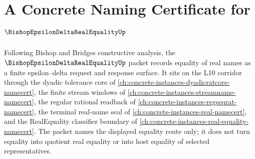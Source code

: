 \chapter{A Concrete Naming Certificate for $\BishopEpsilonDeltaRealEqualityUp$}
\label{ch:concrete-instances-bishop-epsilon-delta-real-equality-namecert}

Following Bishop and Bridges constructive analysis, the $\BishopEpsilonDeltaRealEqualityUp$ packet records equality of real names as a finite epsilon--delta request and response surface. It sits on the L10 corridor through the dyadic tolerance core of \autoref{ch:concrete-instances-dyadicratcore-namecert}, the finite stream windows of \autoref{ch:concrete-instances-streamname-namecert}, the regular rational readback of \autoref{ch:concrete-instances-regseqrat-namecert}, the terminal real-name seal of \autoref{ch:concrete-instances-real-namecert}, and the RealEquality classifier boundary of \autoref{ch:concrete-instances-real-equality-namecert}. The packet names the displayed equality route only; it does not turn equality into quotient real equality or into host equality of selected representatives.

